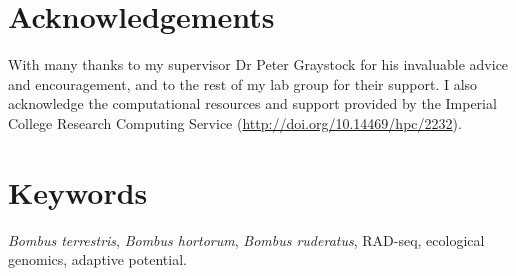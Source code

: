 \documentclass[12pt]{article}
\begin{document}
    
    \section*{Acknowledgements}
    
    With many thanks to my supervisor Dr Peter Graystock for his invaluable advice and encouragement, and to the rest of my lab group for their support. I also acknowledge the computational resources and support provided by the Imperial College Research Computing Service (\url{http://doi.org/10.14469/hpc/2232}).
    
    \section*{Keywords}
    
    \emph{Bombus terrestris}, \emph{Bombus hortorum}, \emph{Bombus ruderatus}, RAD-seq, ecological genomics, adaptive potential.
    
    \newpage
    
\end{document}
